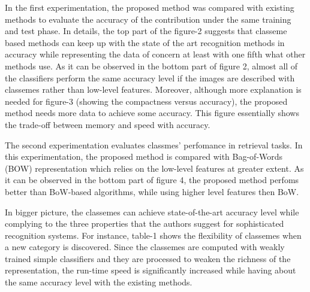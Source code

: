 \documentclass[11pt]{article}
\begin{document}
In the first experimentation, the proposed method was compared with existing methods to evaluate the accuracy of the contribution under the same training and test phase.
In details, the top part of the figure-2 suggests that classeme based methods can keep up with the state of the art recognition methods in accuracy while representing the data of concern at least with one fifth what other methods use.
As it can be observed in the bottom part of figure 2, almost all of the classifiers perform the same accuracy level if the images are described with classemes rather than low-level features.
Moreover, although more explanation is needed for figure-3 (showing the compactness versus accuracy), the proposed method needs more data to achieve some accuracy.
This figure essentially shows the trade-off between memory and speed with accuracy.

The second experimentation evaluates classmes' perfomance in retrieval tasks.
In this experimentation, the proposed method is compared with Bag-of-Words (BOW) representation which relies on the low-level features at greater extent.
As it can be observed in the bottom part of figure 4, the proposed method perfoms better than BoW-based algorithms, while using higher level features then BoW.

In bigger picture, the classemes can achieve state-of-the-art accuracy level while complying to the three properties that the authors suggest for sophisticated recognition systems.
For instance, table-1 shows the flexibility of classemes when a new category is discovered.
Since the classemes are computed with weakly trained simple classifiers and they are processed to weaken the richness of the representation, the run-time speed is significantly increased while having about the same accuracy level with the existing methods.


% 
% 
\end{document}
